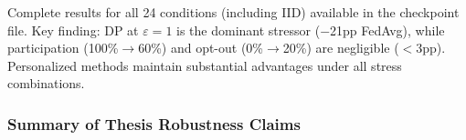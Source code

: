 \documentclass[conference]{IEEEtran}
\begin{document}
\begin{table}[htbp]
\centering
\caption{Compound EHDS Stress Frontier (Cardiovascular, non-IID $\alpha{=}0.5$): Accuracy (\%) under combined stressors. Mean $\pm$ std over 3 seeds. Bold = best per condition. $\Delta_D$ = Ditto $-$ FedAvg gap.}
\label{tab:compound_stress}
\par{\footnotesize Complete results for all 24 conditions (including IID) available in the checkpoint file. Key finding: DP at $\varepsilon{=}1$ is the dominant stressor ($-$21pp FedAvg), while participation (100\%$\to$60\%) and opt-out (0\%$\to$20\%) are negligible ($<$3pp). Personalized methods maintain substantial advantages under all stress combinations.}
\end{table}

\subsubsection{Summary of Thesis Robustness Claims}
\label{sec:thesis_summary}
\end{document}
